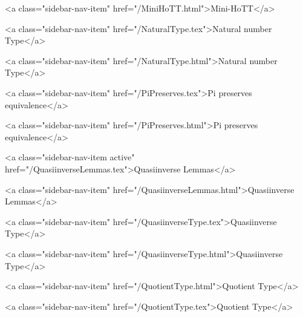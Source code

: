       
        
          <a class="sidebar-nav-item" href="/MiniHoTT.html">Mini-HoTT</a>
        
      
    
      
        
          <a class="sidebar-nav-item" href="/NaturalType.tex">Natural number Type</a>
        
      
    
      
        
          <a class="sidebar-nav-item" href="/NaturalType.html">Natural number Type</a>
        
      
    
      
        
          <a class="sidebar-nav-item" href="/PiPreserves.tex">Pi preserves equivalence</a>
        
      
    
      
        
          <a class="sidebar-nav-item" href="/PiPreserves.html">Pi preserves equivalence</a>
        
      
    
      
        
          <a class="sidebar-nav-item active" href="/QuasiinverseLemmas.tex">Quasiinverse Lemmas</a>
        
      
    
      
        
          <a class="sidebar-nav-item" href="/QuasiinverseLemmas.html">Quasiinverse Lemmas</a>
        
      
    
      
        
          <a class="sidebar-nav-item" href="/QuasiinverseType.tex">Quasiinverse Type</a>
        
      
    
      
        
          <a class="sidebar-nav-item" href="/QuasiinverseType.html">Quasiinverse Type</a>
        
      
    
      
        
          <a class="sidebar-nav-item" href="/QuotientType.html">Quotient Type</a>
        
      
    
      
        
          <a class="sidebar-nav-item" href="/QuotientType.tex">Quotient Type</a>
        
